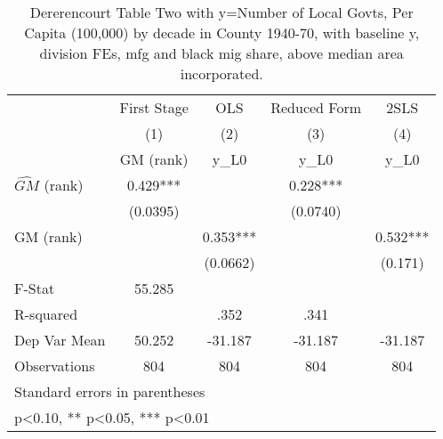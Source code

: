 \begin{table}[htbp]\centering
\def\sym#1{\ifmmode^{#1}\else\(^{#1}\)\fi}
\caption{Dererencourt Table Two with y=Number of Local Govts, Per Capita (100,000) by decade in County 1940-70, with baseline y, division FEs, mfg and black mig share, above median area incorporated.}
\begin{tabular}{l*{4}{c}}
\toprule
                    & First Stage   &         OLS   &Reduced Form   &        2SLS   \\
                    &\multicolumn{1}{c}{(1)}&\multicolumn{1}{c}{(2)}&\multicolumn{1}{c}{(3)}&\multicolumn{1}{c}{(4)}\\
                    &\multicolumn{1}{c}{GM  (rank)}&\multicolumn{1}{c}{y\_L0}&\multicolumn{1}{c}{y\_L0}&\multicolumn{1}{c}{y\_L0}\\
\midrule
$\hat{GM}$ (rank)   &       0.429***&               &       0.228***&               \\
                    &    (0.0395)   &               &    (0.0740)   &               \\
\addlinespace
GM  (rank)          &               &       0.353***&               &       0.532***\\
                    &               &    (0.0662)   &               &     (0.171)   \\
\midrule
F-Stat              &      55.285   &               &               &               \\
R-squared           &               &        .352   &        .341   &               \\
Dep Var Mean        &      50.252   &     -31.187   &     -31.187   &     -31.187   \\
Observations        &         804   &         804   &         804   &         804   \\
\bottomrule
\multicolumn{5}{l}{\footnotesize Standard errors in parentheses}\\
\multicolumn{5}{l}{\footnotesize * p<0.10, ** p<0.05, *** p<0.01}\\
\end{tabular}
\end{table}

